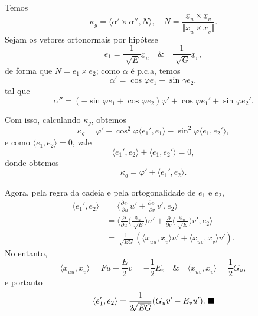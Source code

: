 \documentclass[../differential_geometry.tex]{subfiles}
\begin{document}
\begin{proof*}
	Temos
	\[
		\kappa_g = \langle \alpha'\times \alpha '', N \rangle, \quad N = \frac{\underline{x}_u \times \underline{x}_v}{\Vert \underline{x}_u \times \underline{x}_v \Vert}.
	\]
	Sejam os vetores ortonormais por hipótese
	\[
		e_1 = \frac{1}{\sqrt[]{E}}\underline{x}_u \quad\&\quad \frac{1}{\sqrt[]{G}}\underline{x}_v,
	\]
	de forma que \(N = e_1 \times e_2\); como \(\alpha \) é p.c.a, temos
	\[
		\alpha '=\cos^{}{\varphi }e_1 + \sin^{}{\gamma }e_2,
	\]
	tal que
	\[
		\alpha ''=(-\sin^{}{\varphi } e_1 + \cos^{}{\varphi }e_2) \varphi ' + \cos^{}{\varphi }e_1'+\sin^{}{\varphi }e_2'.
	\]

	Com isso, calculando \(\kappa_g\), obtemos
	\[
		\kappa_g = \varphi'+\cos^{2}{\varphi }\langle e_1', e_1 \rangle - \sin^{2}{\varphi }\langle e_1, e_2' \rangle,
	\]
	e como \(\langle e_1, e_2 \rangle = 0\), vale
	\[
		\langle e_1', e_2 \rangle + \langle e_1, e_2' \rangle = 0,
	\]
	donde obtemos
	\[
		\kappa_g = \varphi '+\langle e_1', e_2 \rangle.
	\]

	Agora, pela regra da cadeia e pela ortogonalidade de \(e_1\) e \(e_2\),
	\begin{align*}
		\langle e_1', e_2 \rangle & = \biggl\langle \frac{\partial^{}e_1}{\partial u^{}} u'+ \frac{\partial^{}e_1}{\partial v^{}}v', e_2 \biggr\rangle                                                                                            \\
		                          & = \biggl\langle \frac{\partial^{}}{\partial u^{}}\biggl(\frac{\underline{x}_u}{\sqrt[]{E}}\biggr)u' + \frac{\partial^{}}{\partial v^{}} \biggl(\frac{\underline{x}_u}{\sqrt[]{E}}\biggr)v', e_2 \biggr\rangle \\
		                          & = \frac{1}{\sqrt[]{EG}}(\langle \underline{x}_{uu}, \underline{x}_v \rangle u' + \langle \underline{x}_{uv}, \underline{x}_v \rangle v').
	\end{align*}
	No entanto,
	\[
		\langle \underline{x}_{uu}, \underline{x}_v \rangle = Fu - \frac{E}{2}v = -\frac{1}{2}E_v  \quad\&\quad \langle \underline{x}_{uv}, \underline{x}_v \rangle = \frac{1}{2}G_u,
	\]
	e portanto
	\[
		\langle e_1', e_2 \rangle = \frac{1}{2\sqrt[]{EG}}(G_uv'-E_vu'). \text{ $\blacksquare$}
	\]
\end{proof*}
\end{document}
